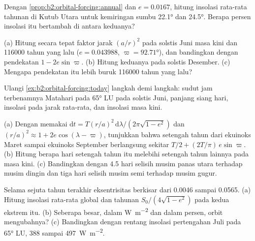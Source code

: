 \begin{exercise}[$\star$]\label{exo:b2:orbital-forcing:4}
Dengan \cref{prop:b2:orbital-forcing:annual} dan $e = 0.0167$, hitung insolasi rata-rata tahunan di
Kutub Utara untuk kemiringan sumbu \ang{22.1} dan \ang{24.5}. Berapa persen insolasi itu bertambah di antara
keduanya?
\end{exercise}

\begin{exercise}[$\star\star$]\label{exo:b2:orbital-forcing:5}
(a) Hitung secara tepat faktor jarak $(a/r)^2$ pada solstis Juni masa kini dan \num{116000} tahun
yang lalu ($e = 0.043988$, $\varpi = \ang{92.71}$), dan bandingkan dengan pendekatan $1 -
2e\sin\varpi$. (b) Hitung keduanya pada solstis Desember. (c) Mengapa pendekatan itu lebih buruk \num{116000}
tahun yang lalu?
\end{exercise}

\begin{exercise}[$\star\star$]\label{exo:b2:orbital-forcing:6}
Ulangi \cref{ex:b2:orbital-forcing:today} langkah demi langkah: sudut jam terbenamnya Matahari pada \ang{65} LU
pada solstis Juni, panjang siang hari, insolasi pada jarak rata-rata, dan
insolasi masa kini.
\end{exercise}

\begin{exercise}[$\star\star$]\label{exo:b2:orbital-forcing:7}
(a) Dengan memakai $\mathrm dt = T(r/a)^2\,\mathrm d\lambda/(2\pi\sqrt{1 - e^2})$ dan $(r/a)^2 \approx 1 +
2e\cos(\lambda - \varpi)$, tunjukkan bahwa setengah tahun dari ekuinoks Maret sampai ekuinoks September berlangsung
sekitar $T/2 + (2T/\pi)\,e\sin\varpi$. (b) Hitung berapa hari setengah tahun itu melebihi setengah tahun lainnya
pada masa kini. (c) Bandingkan dengan 4.5 hari selisih musim panas utara terhadap musim dingin dan tiga hari selisih
musim semi terhadap musim gugur.
\end{exercise}

\begin{exercise}[$\star\star$]\label{exo:b2:orbital-forcing:8}
Selama sejuta tahun terakhir eksentrisitas berkisar dari \num{0.0046} sampai \num{0.0565}. (a) Hitung
insolasi rata-rata global dan tahunan $S_0/(4\sqrt{1 - e^2})$ pada kedua ekstrem itu. (b) Seberapa besar, dalam
\unit{W.m^{-2}} dan dalam persen, orbit mengubahnya? (c) Bandingkan dengan rentang
insolasi pertengahan Juli pada \ang{65} LU, 388 sampai \qty{497}{W.m^{-2}}.
\end{exercise}

